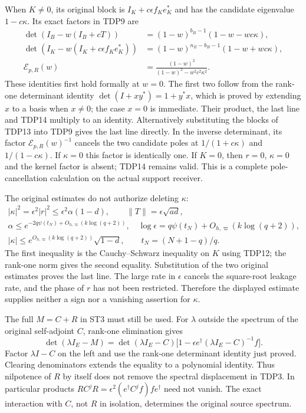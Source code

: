 When $K\ne0$, its original block is $I_K+c\epsilon f_Ke_K^*$ and has
the candidate eigenvalue $1-c\kappa$. Its exact factors in TDP9 are
\begin{equation}\tag{TDP15}
\begin{aligned}
\det(I_B-w(I_B+cT))
 &=(1-w)^{b_B-1}(1-w-wc\kappa),\\
\det(I_K-w(I_K+c\epsilon f_Ke_K^*))
 &=(1-w)^{n_E-b_B-1}(1-w+wc\kappa),\\
\mathcal E_{p,R}(w)
 &=\frac{(1-w)^2}{(1-w)^2-w^2c^2\kappa^2}.
\end{aligned}
\end{equation}
These identities first hold formally at $w=0$. The first two follow
from the rank-one determinant identity
$\det(I+xy^*)=1+y^*x$, which is proved by extending $x$ to a basis when
$x\ne0$; the case $x=0$ is immediate. Their product, the last line and
TDP14 multiply to an identity. Alternatively substituting the blocks
of TDP13 into TDP9 gives the last line directly. In the inverse
determinant, its factor $\mathcal E_{p,R}(w)^{-1}$ cancels the two
candidate poles at $1/(1+c\kappa)$ and $1/(1-c\kappa)$. If $\kappa=0$
this factor is identically one. If $K=0$, then $r=0$, $\kappa=0$ and the
kernel factor is absent; TDP14 remains valid. This is a complete
pole-cancellation calculation on the actual support receiver.

The original estimates do not authorize deleting $\kappa$:
\begin{equation}\tag{TDP16}
\begin{gathered}
|\kappa|^2=\epsilon^2|r|^2
 \le\epsilon^2\alpha(1-d),\qquad
\|T\|=\epsilon\sqrt{ad},\\
\alpha\le e^{-2q\psi(t_N)+O_{h,\varpi}(k\log(q+2))},\quad
\log\epsilon=q\psi(t_N)+O_{h,\varpi}(k\log(q+2)),\\
|\kappa|\le e^{O_{h,\varpi}(k\log(q+2))}\sqrt{1-d},
\qquad t_N=(N+1-q)/q.
\end{gathered}
\end{equation}
The first inequality is the Cauchy--Schwarz inequality on $K$ using
TDP12; the rank-one norm gives the second equality. Substitution of the
two original estimates proves the last line. The large rate in
$\epsilon$ cancels the square-root leakage rate, and the phase of $r$
has not been restricted. Therefore the displayed estimate supplies
neither a sign nor a vanishing assertion for $\kappa$.

The full $M=C+R$ in ST3 must still be used. For $\lambda$ outside the
spectrum of the original self-adjoint $C$, rank-one elimination gives
\begin{equation}\tag{TDP17}
\det(\lambda I_E-M)=\det(\lambda I_E-C)
 \bigl[1-\epsilon e^\dagger(\lambda I_E-C)^{-1}f\bigr].
\end{equation}
Factor $\lambda I-C$ on the left and use the rank-one determinant
identity just proved. Clearing denominators extends the equality to a
polynomial identity. Thus nilpotence of $R$ by itself does not remove
the spectral displacement in TDP3. In particular products
$RC^jR=\epsilon^2(e^\dagger C^jf)fe^\dagger$ need not vanish.
The exact interaction with $C$, not $R$ in isolation, determines the
original source spectrum.

